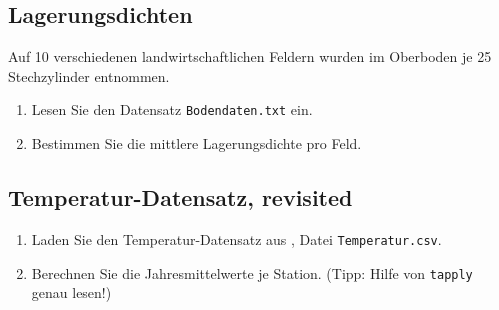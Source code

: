 \documentclass[]{book}
\providecommand{\tightlist}{%
  \setlength{\itemsep}{0pt}\setlength{\parskip}{0pt}}
\begin{document}
\hypertarget{lagerungsdichten}{%
\subsection{Lagerungsdichten}\label{lagerungsdichten}}

Auf 10 verschiedenen landwirtschaftlichen Feldern wurden im Oberboden je 25 Stechzylinder entnommen.

\begin{enumerate}
\def\labelenumi{\arabic{enumi}.}
\tightlist
\item
  Lesen Sie den Datensatz \texttt{Bodendaten.txt} ein.
\item
  Bestimmen Sie die mittlere Lagerungsdichte pro Feld.
\end{enumerate}

\hypertarget{temperatur-datensatz-revisited}{%
\subsection{Temperatur-Datensatz, revisited}\label{temperatur-datensatz-revisited}}

\begin{enumerate}
\def\labelenumi{\arabic{enumi}.}
\tightlist
\item
  Laden Sie den Temperatur-Datensatz aus \citet{Zuur2009a}, Datei \texttt{Temperatur.csv}.
\item
  Berechnen Sie die Jahresmittelwerte je Station. (Tipp: Hilfe von \texttt{tapply} genau lesen!)
\end{enumerate}

\hypertarget{refs}{}


\end{document}
